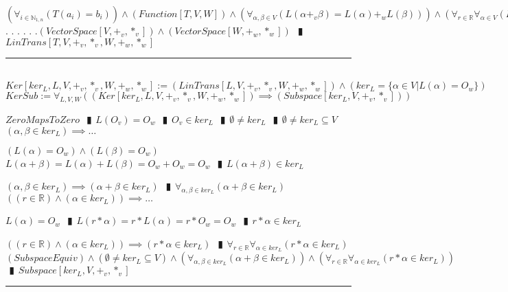 \documentclass{book}
\newcommand{\abr}{:=}
\newcommand{\cont}{\phantom{.}. . .\phantom{.}}
\newcommand{\pipe}{$\phantom{(}\vrectangleblack\phantom{)}$}
\begin{document}
\begin{enumerate}
  \lit $(\forall_{i \in \mathbb{N}_{1, n}}(T(a_i) = b_i)) \land (Function[T, V, W]) \land (\forall_{\alpha, \beta \in V}(L(\alpha +_v \beta) = L(\alpha) +_w L(\beta))) \land (\forall_{r \in \mathbb{R}} \forall_{\alpha \in V}(L(r *_v \alpha) = r *_w L(\alpha))) \land$ \cont
  \lit \cont $(VectorSpace[V, +_v, *_v]) \land (VectorSpace[W, +_w, *_w])$ \pipe $LinTrans[T, V, +_v, *_v, W, +_w, *_w]$
\end{enumerate} \vspace{.75mm} \hrule \vspace{.75mm} \ \\ 

$Ker[ker_L, L, V, +_v, *_v, W, +_w, *_w] \abr (LinTrans[L, V, +_v, *_v, W, +_w, *_w]) \land (ker_L = \{\alpha \in V | L(\alpha) = O_w\})$ \\

$KerSub \abr \forall_{L, V, W}((Ker[ker_L, L, V, +_v, *_v, W, +_w, *_w]) \implies (Subspace[ker_L, V, +_v, *_v]))$
\begin{enumerate}
  \lit $ZeroMapsToZero$ \pipe $L(O_v) = O_w$ \pipe $O_v \in ker_L$ \pipe $\emptyset \neq ker_L$ \pipe $\emptyset \neq ker_L \subseteq V$
  \lit $(\alpha, \beta \in ker_L) \implies \ldots$
  \begin{enumerate}
    \lit $(L(\alpha) = O_w) \land (L(\beta) = O_w)$ \lit $L(\alpha + \beta) = L(\alpha) + L(\beta) = O_w + O_w = O_w$ \pipe $L(\alpha + \beta) \in ker_L$
  \end{enumerate}
  \lit $(\alpha, \beta \in ker_L) \implies (\alpha + \beta \in ker_L)$ \pipe $\forall_{\alpha, \beta \in ker_L}(\alpha + \beta \in ker_L)$
  \lit $((r \in \mathbb{R}) \land (\alpha \in ker_L)) \implies \ldots$
  \begin{enumerate}
    \lit $L(\alpha) = O_w$ \pipe $L(r * \alpha) = r * L(\alpha) = r * O_w = O_w$ \pipe $r * \alpha \in ker_L$
  \end{enumerate}
  \lit $((r \in \mathbb{R}) \land (\alpha \in ker_L)) \implies (r * \alpha \in ker_L)$ \pipe $\forall_{r \in \mathbb{R}} \forall_{\alpha \in ker_L}(r * \alpha \in ker_L)$
  \lit $(SubspaceEquiv) \land (\emptyset \neq ker_L \subseteq V) \land (\forall_{\alpha, \beta \in ker_L}(\alpha + \beta \in ker_L)) \land (\forall_{r \in \mathbb{R}} \forall_{\alpha \in ker_L}(r * \alpha \in ker_L))$ \pipe $Subspace[ker_L, V, +_v, *_v]$
\end{enumerate} \vspace{.75mm} \hrule \vspace{.75mm} \ \\ 
\end{document}
